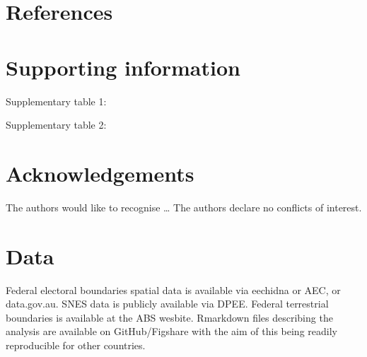 \documentclass[a4paper,11pt]{article}
\begin{document}
\newpage
\nolinenumbers
\section{References}
\printbibliography

\newpage
\section{Supporting information}

Supplementary table 1:


Supplementary table 2:


\newpage
\section{Acknowledgements}
The authors would like to recognise \ldots
The authors declare no conflicts of interest.

\newpage
\section{Data}
Federal electoral boundaries spatial data is available via eechidna or AEC, or data.gov.au.
SNES data is publicly available via DPEE.
Federal terrestrial boundaries is available at the ABS wesbite.
Rmarkdown files describing the analysis are available on GitHub/Figshare with the aim of this being readily reproducible for other countries.
\end{document}
